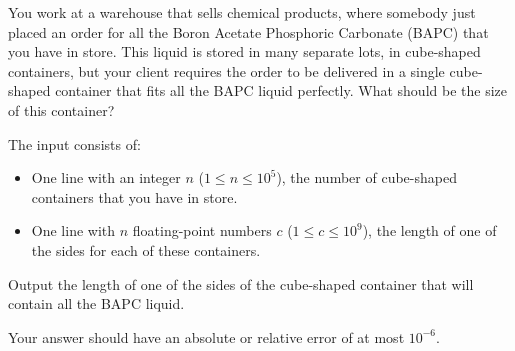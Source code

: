 

\newcommand{\maxn}{10^5}
\newcommand{\maxc}{10^9}

You work at a warehouse that sells chemical products,
where somebody just placed an order for all the Boron Acetate Phosphoric Carbonate (BAPC) that you have in store.
This liquid is stored in many separate lots, in cube-shaped containers,
but your client requires the order to be delivered in a single cube-shaped container
that fits all the BAPC liquid perfectly.
What should be the size of this container?

\begin{Input}
    The input consists of:
    \begin{itemize}
        \item One line with an integer $n$ ($1\leq n\leq \maxn$),
            the number of cube-shaped containers that you have in store.
        \item One line with $n$ floating-point numbers $c$ ($1\leq c\leq \maxc$),
            the length of one of the sides for each of these containers.
    \end{itemize}
\end{Input}

\begin{Output}
    Output the length of one of the sides of the cube-shaped container that will contain all the BAPC liquid.

    Your answer should have an absolute or relative error of at most $10^{-6}$.
\end{Output}
